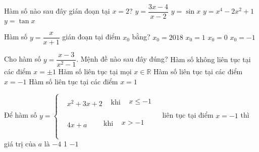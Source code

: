 \begin{ex}%
	
	Hàm số nào sau đây gián đoạn tại $x=2$?
	\choice
	{\True $y=\dfrac{3x-4}{x-2}$}
	{ $y=\sin x$}
	{ $y=x^4-2x^2+1$}
	{ $y=\tan x$}
\end{ex}
\begin{ex}%
	
	Hàm số $y=\dfrac{x}{x+1}$ gián đoạn tại điểm $x_0$ bằng?
	\choice
	{ $x_0=2018$}
	{ $x_0=1$}
	{ $x_0=0$}
	{\True $x_0=-1$}
\end{ex}
\begin{ex}%
	
	Cho hàm số $y=\dfrac{x-3}{x^2-1}$. Mệnh đề nào sau đây đúng?
	\choice
	{\True Hàm số không liên tục tại các điểm $x=\pm 1$}
	{ Hàm số liên tục tại mọi $x\in \mathbb{R}$}
	{ Hàm số liên tục tại các điểm $x=-1$}
	{ Hàm số liên tục tại các điểm $x=1$}
\end{ex}
\begin{ex}%
	
	Để hàm số $y=\left\{ \begin{aligned}
		& {x^2}+3x+2\begin{matrix}
			{} & \text{khi}\begin{matrix}
				{} & x\le -1 \\
			\end{matrix} \\
		\end{matrix} \\
		& 4x+a\begin{matrix}
			{} & {} & \,\,\text{khi}\begin{matrix}
				{} & x>-1 \\
			\end{matrix} \\
		\end{matrix} \\
	\end{aligned} \right.$ liên tục tại điểm $x=-1$ thì giá trị của $a$ là
	\choice
	{ $-4$}
	{}
	{ 1}
	{ $-1$}
\end{ex}
